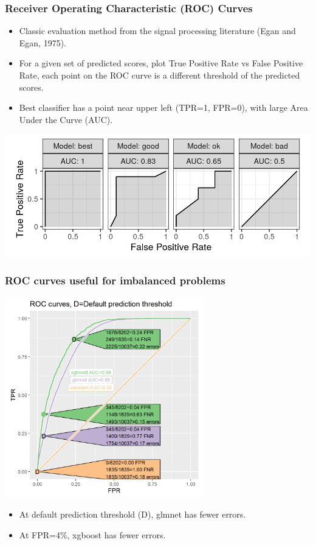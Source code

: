 \documentclass[t]{beamer}
\begin{document}
\begin{frame}
  \frametitle{Receiver Operating Characteristic (ROC) Curves}
  \begin{itemize}
  \item Classic evaluation method from the signal processing
    literature (Egan and Egan, 1975).
  \item For a given set of predicted scores, plot True Positive Rate
    vs False Positive Rate, each point on the ROC curve is a different
    threshold of the predicted scores.
  \item Best classifier has a point near upper left (TPR=1, FPR=0), with large
    Area Under the Curve (AUC).
  \end{itemize}
  \includegraphics[width=\textwidth]{figure-more-than-one-binary}
\end{frame}

\begin{frame}
  \frametitle{ROC curves useful for imbalanced problems}

  \includegraphics[width=0.65\textwidth]{figure-batchtools-expired-earth-roc}

  \begin{itemize}
  \item At default prediction threshold (D), glmnet has fewer errors.
  \item At FPR=4\%, xgboost has fewer errors.
  \end{itemize}
\end{frame}
\end{document}
